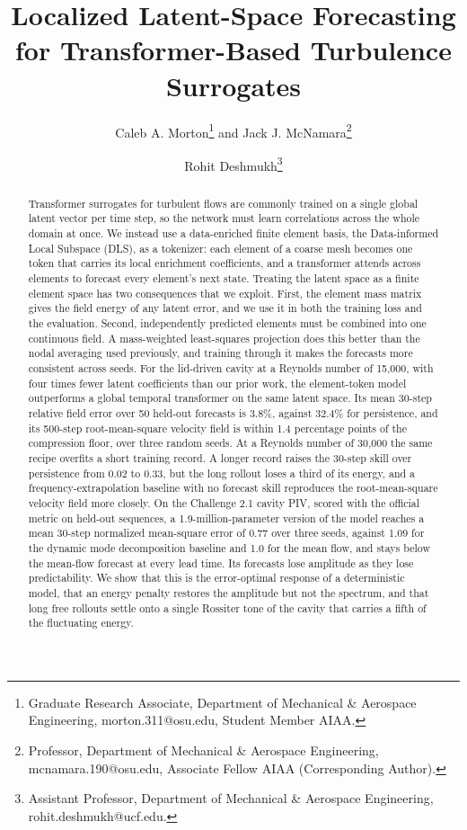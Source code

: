 \documentclass[conf]{new-aiaa}
\title{Localized Latent-Space Forecasting for Transformer-Based Turbulence Surrogates}
\author{Caleb A. Morton\footnote{Graduate Research Associate, Department of Mechanical \& Aerospace Engineering, morton.311@osu.edu, Student Member AIAA.} and Jack J. McNamara\footnote{Professor, Department of Mechanical \& Aerospace Engineering, mcnamara.190@osu.edu, Associate Fellow AIAA (Corresponding Author).}}
\affil{The Ohio State University, Columbus, Ohio, 43210}
\author{Rohit Deshmukh\footnote{Assistant Professor, Department of Mechanical \& Aerospace Engineering, rohit.deshmukh@ucf.edu.}}
\affil{University of Central Florida, Orlando, Florida, 32816}
\begin{document}
\maketitle

\begin{abstract}
Transformer surrogates for turbulent flows are commonly trained on a single global latent vector per time step, so the network must learn correlations across the whole domain at once. We instead use a data-enriched finite element basis, the Data-informed Local Subspace (DLS), as a tokenizer: each element of a coarse mesh becomes one token that carries its local enrichment coefficients, and a transformer attends across elements to forecast every element's next state. Treating the latent space as a finite element space has two consequences that we exploit. First, the element mass matrix gives the field energy of any latent error, and we use it in both the training loss and the evaluation. Second, independently predicted elements must be combined into one continuous field. A mass-weighted least-squares projection does this better than the nodal averaging used previously, and training through it makes the forecasts more consistent across seeds. For the lid-driven cavity at a Reynolds number of 15,000, with four times fewer latent coefficients than our prior work, the element-token model outperforms a global temporal transformer on the same latent space. Its mean 30-step relative field error over 50 held-out forecasts is 3.8\%, against 32.4\% for persistence, and its 500-step root-mean-square velocity field is within 1.4 percentage points of the compression floor, over three random seeds. At a Reynolds number of 30,000 the same recipe overfits a short training record. A longer record raises the 30-step skill over persistence from 0.02 to 0.33, but the long rollout loses a third of its energy, and a frequency-extrapolation baseline with no forecast skill reproduces the root-mean-square velocity field more closely. On the Challenge 2.1 cavity PIV, scored with the official metric on held-out sequences, a 1.9-million-parameter version of the model reaches a mean 30-step normalized mean-square error of 0.77 over three seeds, against 1.09 for the dynamic mode decomposition baseline and 1.0 for the mean flow, and stays below the mean-flow forecast at every lead time. Its forecasts lose amplitude as they lose predictability. We show that this is the error-optimal response of a deterministic model, that an energy penalty restores the amplitude but not the spectrum, and that long free rollouts settle onto a single Rossiter tone of the cavity that carries a fifth of the fluctuating energy.
\end{abstract}
\end{document}
